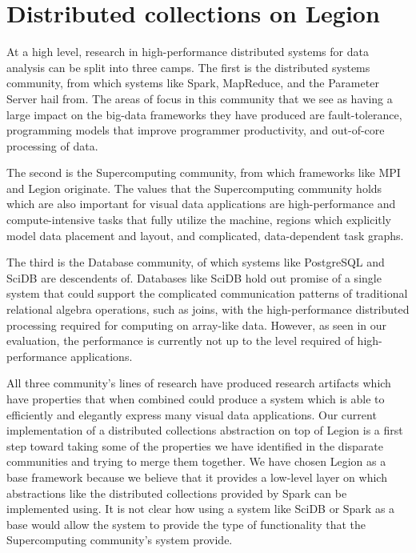 \documentclass[tog]{acmsiggraph}
\begin{document}
\section{Distributed collections on Legion}

At a high level, research in high-performance distributed systems for data
analysis can be split into three camps. The first is the distributed systems
community, from which systems like Spark, MapReduce, and the Parameter Server
hail from. The areas of focus in this community that we see as having a large
impact on the big-data frameworks they have produced are fault-tolerance,
programming models that improve programmer productivity, and out-of-core
processing of data.

The second is the Supercomputing community, from which frameworks like MPI and
Legion \cite{bauer2012legion} originate. The values that the Supercomputing
community holds which are also important for visual data applications are
high-performance and compute-intensive tasks that fully utilize the machine,
regions which explicitly model data placement and layout, and complicated,
data-dependent task graphs.

The third is the Database community, of which systems like PostgreSQL and SciDB
are descendents of. Databases like SciDB hold out promise of a single system
that could support the complicated communication patterns of traditional
relational algebra operations, such as joins, with the high-performance
distributed processing required for computing on array-like data. However, as
seen in our evaluation, the performance is currently not up to the level
required of high-performance applications.

All three community's lines of research have produced research artifacts which
have properties that when combined could produce a system which is able to
efficiently and elegantly express many visual data applications. Our current
implementation of a distributed collections abstraction on top of Legion is a
first step toward taking some of the properties we have identified in the
disparate communities and trying to merge them together. We have chosen Legion
as a base framework because we believe that it provides a low-level layer on
which abstractions like the distributed collections provided by Spark can be
implemented using. It is not clear how using a system like SciDB or Spark as a
base would allow the system to provide the type of functionality that
the Supercomputing community's system provide.
\end{document}
